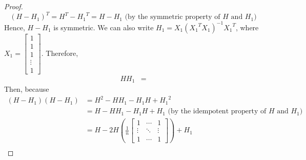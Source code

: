\begin{answer}
\begin{proof}
    \begin{equation}
        {(H - H_1)}^T = H^T - {H_1}^T = H - H_1 \text{ (by the symmetric property of } H \text{ and } H_1 \text{)}
    \end{equation}
    Hence, $H-H_1$ is symmetric. We can also write $H_1 = X_1{({X_1}^TX_1)}^{-1}{X_1}^T$, where $X_1 = \left[\begin{smallmatrix}1 \\1\\1\\ \vdots\\1\end{smallmatrix}\right]$. Therefore, 
    \begin{align}
        HH_1 &= 
    \end{align}
    Then, because
    \begin{align}
        (H-H_1)(H-H_1) &= H^2 - HH_1 - H_1H + {H_1}^2\\ 
        &= H - HH_1 - H_1H + H_1 \text{ (by the idempotent property of } H \text{ and } H_1 \text{)}\\
        &= H - 2H\left(\tfrac{1}{n}\left[\begin{smallmatrix}1&\cdots&1\\ \vdots & \ddots & \vdots\\ 1 & \cdots & 1\end{smallmatrix}\right]\right) + H_1\\
    \end{align}
\end{proof}
\end{answer}